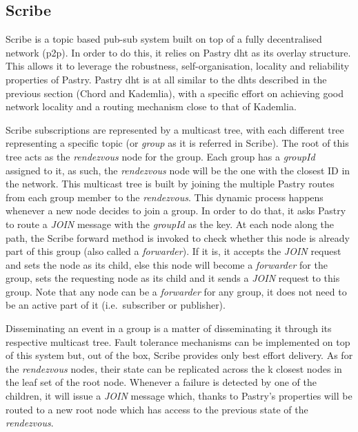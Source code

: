 \subsection{Scribe}\label{scribe}

Scribe \cite{Castro2002} is a topic based pub-sub system built
on top of a fully decentralised network (\acrshort{p2p}). In order to do this, it
relies on Pastry \acrshort{dht} as its overlay structure. This allows it to
leverage the robustness, self-organisation, locality and reliability
properties of Pastry. Pastry \acrshort{dht} is at all similar to the \acrshort{dht}s described
in the previous section (Chord and Kademlia), with a specific effort on
achieving good network locality and a routing mechanism close to that of
Kademlia.

Scribe subscriptions are represented by a multicast tree, with each
different tree representing a specific topic (or \emph{group} as it is
referred in Scribe). The root of this tree acts as the \emph{rendezvous}
node for the group. Each group has a \emph{groupId} assigned to it, as
such, the \emph{rendezvous} node will be the one with the closest ID in
the network. This multicast tree is built by joining the multiple Pastry
routes from each group member to the \emph{rendezvous}. This dynamic
process happens whenever a new node decides to join a group. In order to
do that, it asks Pastry to route a \emph{JOIN} message with the
\emph{groupId} as the key. At each node along the path, the Scribe
forward method is invoked to check whether this node is already part of this
group (also called a \emph{forwarder}). If it is, it accepts the
\emph{JOIN} request and sets the node as its child, else this node will
become a \emph{forwarder} for the group, sets the requesting node as its
child and it sends a \emph{JOIN} request to this group. Note that any
node can be a \emph{forwarder} for any group, it does not need to be an active
part of it (i.e.~subscriber or publisher).

Disseminating an event in a group is a matter of disseminating it
through its respective multicast tree. Fault tolerance mechanisms can be
implemented on top of this system but, out of the box, Scribe provides
only best effort delivery. As for the \emph{rendezvous} nodes, their
state can be replicated across the k closest nodes in the leaf set of
the root node. Whenever a failure is detected by one of the children, it will
issue a \emph{JOIN} message which, thanks to Pastry's properties will be
routed to a new root node which has access to the previous state of the
\emph{rendezvous}.

